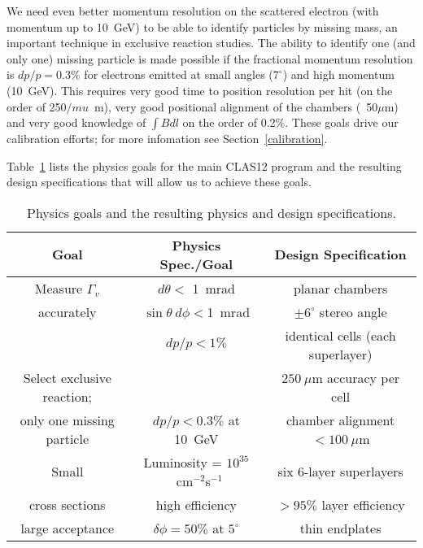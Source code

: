 We need even better momentum resolution on the scattered
electron (with momentum up to 10~GeV) to be able to identify particles
by missing mass, an important technique in exclusive reaction studies.
The ability to identify one (and only one) missing particle is made
possible if the fractional momentum resolution is $dp/p = 0.3\%$ for electrons 
emitted at small angles ($7^{\circ}$) and high momentum (10~GeV).
This requires very good time to position resolution per hit (on the order of 250$/mu$~m),
very good positional alignment of the chambers (\approx~50$\mu$m) and very good knowledge
of $\int Bdl$ on the order of 0.2\%.  These goals drive our calibration efforts; for more
infomation see Section~\ref{calibration}.

Table~\ref{fwd-dc-physics-specifications} lists the physics goals for the main CLAS12 program
and the resulting design specifications that will allow us to achieve these goals.

\small{
\begin{table}[ht]
\begin{center}
\begin{tabular}{||c|c|c||} \hline \hline
   {\bf Goal}         & {\bf Physics Spec./Goal} & {\bf Design Specification}\\ \hline
Measure $\Gamma_v$  & $d \theta <$ 1~mrad   & planar chambers \\ 
accurately  & $\sin \theta ~d \phi < $1~mrad & $\pm 6^\circ$ stereo angle   \\ 
  & $dp/p < 1\% $ & identical cells (each superlayer)  \\ \hline
Select exclusive reaction; &    & $250~\mu$m  accuracy per cell\\ 
only one missing particle    & $dp/p < 0.3\%$ at 10~GeV &    chamber alignment $<100~\mu$m\\  \hline
Small       & Luminosity = $10^{35}$~cm$^{-2}$s$^{-1}$  & six 6-layer superlayers \\ 
cross sections  & high efficiency & $> 95\%$ layer efficiency \\ \hline
large acceptance   & $\delta\phi = 50\%$ at $5^\circ$ & thin endplates\\ \hline
\end{tabular}
\caption{\small{Physics goals and the resulting physics and design specifications.}}
\label{fwd-dc-physics-specifications}
\end{center}
\end{table}
}

